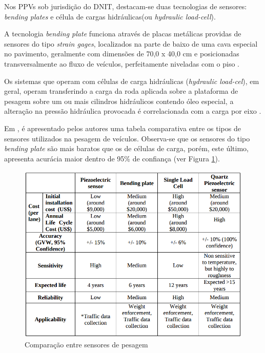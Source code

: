 \documentclass{ufscThesis}
\begin{document}
Nos PPVs sob jurisdição do DNIT, destacam-se duas tecnologias de sensores: \textit{bending plates} e célula de cargas hidráulicas(ou \textit{hydraulic load-cell}).

A tecnologia \textit{bending plate} funciona através de placas metálicas providas de sensores do tipo \textit{strain gages}, localizados na parte de baixo de uma cava especial no pavimento, geralmente com dimensões de 70,0 x 40,0 cm e posicionadas transversalmente ao fluxo de veículos, perfeitamente niveladas com o piso \cite{article:albanorevisando}.

Os sistemas que operam com células de carga hidráulicas (\textit{hydraulic load-cel}), em geral, operam transferindo a carga da roda aplicada sobre a plataforma de pesagem sobre um ou mais cilindros hidráulicos contendo óleo especial, a alteração na pressão hidráulica provocada é correlacionada com a carga por eixo \cite{article:albanorevisando}.

Em \cite[p. 8]{ref:zhang2007evaluating}, é apresentado pelos autores uma tabela comparativa entre os tipos de sensores utilizados na pesagem de veículos. Observa-se que os sensores do tipo \textit{bending plate} são mais baratos que os de células de carga, porém, este último, apresenta acurácia maior dentro de 95\% de confiança (ver Figura \ref{fig:tabela-comparacao-sensores}).

\begin{figure}[h!]
  \caption{Comparação entre sensores de pesagem \cite{ref:zhang2007evaluating}}
  \label{fig:tabela-comparacao-sensores}
  \centering
    \includegraphics[scale=0.4]{./figuras/tabela-comparacao-siwim.png}
\end{figure}
\end{document}
